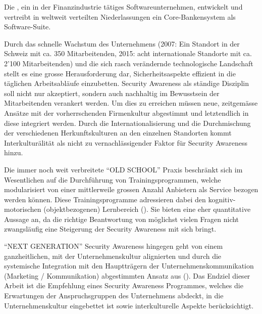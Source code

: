 \documentclass[../../main.tex]{subfiles}
\begin{document}
\begin{sloppypar}
Die \companylong, ein in der Finanzindustrie tätiges Softwareunternehmen, entwickelt und vertreibt in weltweit verteilten Niederlassungen ein Core-Bankensystem als Software-Suite.

Durch das schnelle Wachstum des Unternehmens (2007: Ein Standort in der Schweiz mit ca. 350 Mitarbeitenden, 2015: acht internationale Standorte mit ca. 2'100 Mitarbeitenden) und die sich rasch verändernde technologische Landschaft stellt es eine grosse Herausforderung dar, Sicherheitsaspekte effizient in die täglichen Arbeitsabläufe einzubetten. Security Awareness als ständige Disziplin soll nicht nur akzeptiert, sondern auch nachhaltig im Bewusstsein der Mitarbeitenden verankert werden. Um dies zu erreichen müssen neue, zeitgemässe Ansätze mit der vorherrschenden Firmenkultur abgestimmt und letztendlich in diese integriert werden. Durch die Internationalisierung und die Durchmischung der  verschiedenen Herkunftskulturen an den einzelnen Standorten kommt Interkulturälität als nicht zu vernachlässigender Faktor für Security Awareness hinzu.

Die immer noch weit verbreitete "`OLD SCHOOL"' Praxis beschränkt sich im Wesentlichen auf die Durchführung von Trainingsprogrammen, welche modularisiert von einer mittlerweile grossen Anzahl Anbietern als Service bezogen werden können. Diese Trainingsprogramme adressieren dabei den kognitiv-motorischen (objektbezogenen) Lernbereich (\cite{helisch_security_2009}). Sie bieten eine eher quantitative Aussage an, da die richtige Beantwortung von möglichst vielen Fragen nicht zwangsläufig eine Steigerung der Security Awareness mit sich bringt.

"`NEXT GENERATION"' Security Awareness hingegen geht von einem ganzheitlichen, mit der Unternehmenskultur alignierten und durch die systemische Integration mit den Hauptträgern der Unternehmenskommunikation (Marketing / Kommunikation) abgestimmten Ansatz aus (\cite{helisch_security_2009}). Das Endziel dieser Arbeit ist die Empfehlung eines Security Awareness Programmes, welches die Erwartungen der Anspruchsgruppen des Unternehmens abdeckt, in die Unternehmenskultur eingebettet ist sowie interkulturelle Aspekte berücksichtigt.
\end{sloppypar}
\end{document}

